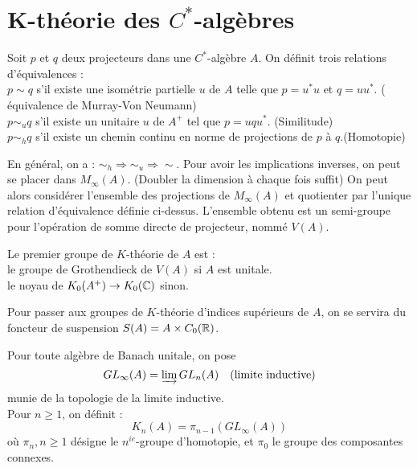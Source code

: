 \section{K-théorie des $C^*$-algèbres}

 
\begin{definition}
Soit $p$ et $q$ deux projecteurs dans une $C^*$-algèbre $A$. On définit trois relations d'équivalences :\\
$p\sim q$ s'il existe une isométrie partielle $u$ de $A$ telle que $p=u^*u $ et $q=uu^*$. ( équivalence de Murray-Von Neumann)\\
$p\sim_u q$ s'il existe un unitaire $u$ de $A^+$ tel que $p=uqu^*$. (Similitude)\\
$p\sim_h q$ s'il existe un chemin continu en norme de projections de $p$ à $q$.(Homotopie)\\
\end{definition}

En général, on a : $\sim_h \Rightarrow \sim_u \Rightarrow \sim$. Pour avoir les implications inverses, on peut se placer dans $M_\infty(A)$. (Doubler la dimension à chaque fois suffit) On peut alors considérer l'ensemble des projections de $M_\infty (A)$ et quotienter par l'unique relation d'équivalence définie ci-dessus. L'ensemble obtenu est un semi-groupe pour l'opération de somme directe de projecteur, nommé $V(A)$.\\

\begin{definition}
Le premier groupe de $K$-théorie de $A$ est :\\
le groupe de Grothendieck de $V(A)$ si $A$ est unitale.\\
le noyau de $K_0(A^+)\rightarrow K_0(\mathbb C)$ sinon.
\end{definition}

Pour passer aux groupes de $K$-théorie d'indices supérieurs de $A$, on se servira du foncteur de suspension $S(A)=A\times C_0(\mathbb R)$.

\begin{definition}
Pour toute algèbre de Banach unitale, on pose \[GL_\infty(A) = \varinjlim GL_n(A) \quad \text{(limite inductive)}\]
munie de la topologie de la limite inductive.\\
Pour $n\geq 1$, on définit :
\[K_n(A)=\pi_{n-1}\left(GL_\infty (A)\right)\] 
où $\pi_n, n\geq 1$ désigne le $n^{ie}$-groupe d'homotopie, et $\pi_0$ le groupe des composantes connexes.
\end{definition}

